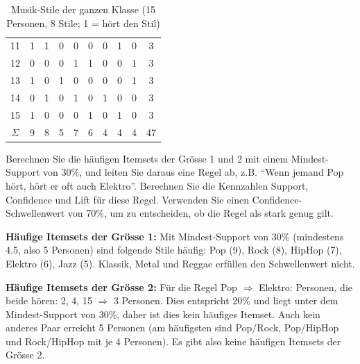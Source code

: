\begin{myexercise}
\begin{table}[H]
\begin{tabular}{cccccccccc}
            11              & 1            & 1             & 0             & 0               & 0                & 0                & 1              & 0               & 3        \\
            12              & 0            & 0             & 0             & 1               & 1                & 0                & 0              & 1               & 3        \\
            13              & 1            & 0             & 1             & 0               & 0                & 0                & 0              & 1               & 3        \\
            14              & 0            & 1             & 0             & 1               & 0                & 1                & 0              & 0               & 3        \\
            15              & 1            & 0             & 0             & 0               & 1                & 0                & 1              & 0               & 3        \\
            \midrule
            $\Sigma$        & 9            & 8             & 5             & 7               & 6                & 4                & 4              & 4               & 47       \\
        \end{tabular}
        \caption{Musik-Stile der ganzen Klasse (15 Personen, 8 Stile; 1 = hört den Stil)}
    \end{table}
    Berechnen Sie die häufigen Itemsets der Grösse 1 und 2 mit einem Mindest-Support von 30\%, und leiten Sie daraus eine Regel ab, z.B. \enquote{Wenn jemand Pop hört, hört er oft auch Elektro}. Berechnen Sie die Kennzahlen Support, Confidence und Lift für diese Regel. Verwenden Sie einen Confidence-Schwellenwert von 70\%, um zu entscheiden, ob die Regel als stark genug gilt.

    \begin{myanswer}
        \textbf{Häufige Itemsets der Grösse 1:} Mit Mindest-Support von 30\% (mindestens 4.5, also 5 Personen) sind folgende Stile häufig:
        Pop (9), Rock (8), HipHop (7), Elektro (6), Jazz (5). Klassik, Metal und Reggae erfüllen den Schwellenwert nicht.

        \textbf{Häufige Itemsets der Grösse 2:} Für die Regel Pop $\Rightarrow$ Elektro:
        Personen, die beide hören: 2, 4, 15 $\Rightarrow$ 3 Personen. Dies entspricht 20\% und liegt unter dem Mindest-Support von 30\%, daher ist dies kein häufiges Itemset. Auch kein anderes Paar erreicht 5 Personen (am häufigsten sind Pop/Rock, Pop/HipHop und Rock/HipHop mit je 4 Personen). Es gibt also keine häufigen Itemsets der Grösse 2.


\end{myanswer}
\end{myexercise}

